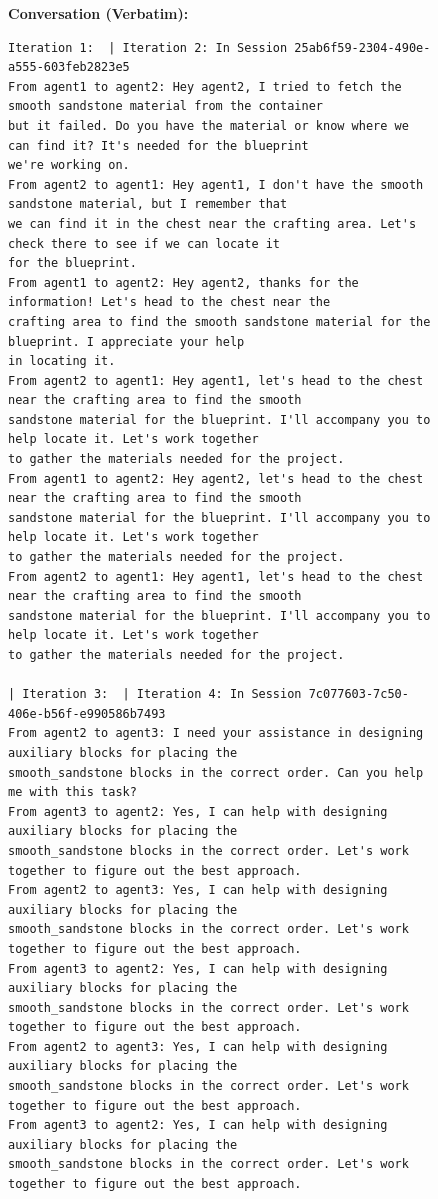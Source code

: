 \begin{figure}[htbp]
\centering
\begin{tcolorbox}[
    title=\textbf{Bad Communication Case \#1},
    colback=red!1!white,
    colframe=red!50!black,
    fonttitle=\bfseries
]
\small

\textbf{Conversation (Verbatim):}
\begin{verbatim}
Iteration 1:  | Iteration 2: In Session 25ab6f59-2304-490e-a555-603feb2823e5
From agent1 to agent2: Hey agent2, I tried to fetch the smooth sandstone material from the container
but it failed. Do you have the material or know where we can find it? It's needed for the blueprint
we're working on.
From agent2 to agent1: Hey agent1, I don't have the smooth sandstone material, but I remember that
we can find it in the chest near the crafting area. Let's check there to see if we can locate it
for the blueprint.
From agent1 to agent2: Hey agent2, thanks for the information! Let's head to the chest near the
crafting area to find the smooth sandstone material for the blueprint. I appreciate your help
in locating it.
From agent2 to agent1: Hey agent1, let's head to the chest near the crafting area to find the smooth
sandstone material for the blueprint. I'll accompany you to help locate it. Let's work together
to gather the materials needed for the project.
From agent1 to agent2: Hey agent2, let's head to the chest near the crafting area to find the smooth
sandstone material for the blueprint. I'll accompany you to help locate it. Let's work together
to gather the materials needed for the project.
From agent2 to agent1: Hey agent1, let's head to the chest near the crafting area to find the smooth
sandstone material for the blueprint. I'll accompany you to help locate it. Let's work together
to gather the materials needed for the project.

| Iteration 3:  | Iteration 4: In Session 7c077603-7c50-406e-b56f-e990586b7493
From agent2 to agent3: I need your assistance in designing auxiliary blocks for placing the
smooth_sandstone blocks in the correct order. Can you help me with this task?
From agent3 to agent2: Yes, I can help with designing auxiliary blocks for placing the
smooth_sandstone blocks in the correct order. Let's work together to figure out the best approach.
From agent2 to agent3: Yes, I can help with designing auxiliary blocks for placing the
smooth_sandstone blocks in the correct order. Let's work together to figure out the best approach.
From agent3 to agent2: Yes, I can help with designing auxiliary blocks for placing the
smooth_sandstone blocks in the correct order. Let's work together to figure out the best approach.
From agent2 to agent3: Yes, I can help with designing auxiliary blocks for placing the
smooth_sandstone blocks in the correct order. Let's work together to figure out the best approach.
From agent3 to agent2: Yes, I can help with designing auxiliary blocks for placing the
smooth_sandstone blocks in the correct order. Let's work together to figure out the best approach.


\end{verbatim}
\end{tcolorbox}
\end{figure}
